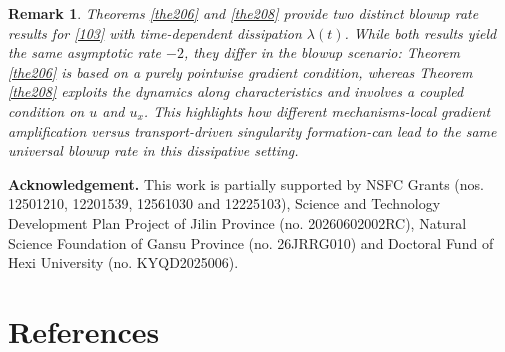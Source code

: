 \documentclass[preprint,12pt]{elsarticle}
\numberwithin{equation}{section}
\newtheorem{remark}{Remark}[section]
\begin{document}
\begin{remark}
Theorems \ref{the206} and \ref{the208} provide two distinct blowup rate results for \eqref{103} with time-dependent dissipation $\lambda(t)$.
While both results yield the same asymptotic rate $-2$, they differ in the blowup scenario: Theorem \ref{the206} is based on a purely pointwise gradient condition, whereas Theorem \ref{the208} exploits the dynamics along characteristics and involves a coupled condition on $u$ and $u_x$. This highlights how different mechanisms-local gradient amplification versus transport-driven singularity formation-can lead to the same universal blowup rate in this dissipative setting.
\end{remark}


































\vskip 5mm

{\bf Acknowledgement.}
This work is partially supported by NSFC Grants (nos. 12501210, 12201539, 12561030 and 12225103), Science and Technology Development Plan Project of Jilin Province (no. 20260602002RC), Natural Science Foundation of Gansu Province (no. 26JRRG010) and Doctoral Fund of Hexi University (no. KYQD2025006).

\section*{References}
\end{document}
